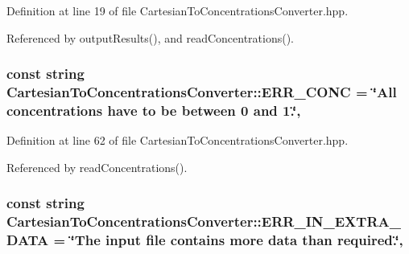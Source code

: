 Definition at line 19 of file Cartesian\-To\-Concentrations\-Converter.\-hpp.



Referenced by output\-Results(), and read\-Concentrations().

\hypertarget{classmultiscale_1_1video_1_1CartesianToConcentrationsConverter_aef2ea334bd0d1b4fa35cf41a2d36369b}{
\subsubsection[{E\-R\-R\-\_\-\-C\-O\-N\-C}]{\setlength{\rightskip}{0pt plus 5cm}const string Cartesian\-To\-Concentrations\-Converter\-::\-E\-R\-R\-\_\-\-C\-O\-N\-C = \char`\"{}All {\bf concentrations} have to be between 0 and 1.\char`\"{}\hspace{0.3cm}{\ttfamily [static]}, {\ttfamily [private]}}}\label{classmultiscale_1_1video_1_1CartesianToConcentrationsConverter_aef2ea334bd0d1b4fa35cf41a2d36369b}


Definition at line 62 of file Cartesian\-To\-Concentrations\-Converter.\-hpp.



Referenced by read\-Concentrations().

\hypertarget{classmultiscale_1_1video_1_1CartesianToConcentrationsConverter_a9653da0f45a36f52e85a243bb975f76e}{
\subsubsection[{E\-R\-R\-\_\-\-I\-N\-\_\-\-E\-X\-T\-R\-A\-\_\-\-D\-A\-T\-A}]{\setlength{\rightskip}{0pt plus 5cm}const string Cartesian\-To\-Concentrations\-Converter\-::\-E\-R\-R\-\_\-\-I\-N\-\_\-\-E\-X\-T\-R\-A\-\_\-\-D\-A\-T\-A = \char`\"{}The input file contains more data than required.\char`\"{}\hspace{0.3cm}{\ttfamily [static]}, {\ttfamily [private]}}}\label{classmultiscale_1_1video_1_1CartesianToConcentrationsConverter_a9653da0f45a36f52e85a243bb975f76e}


